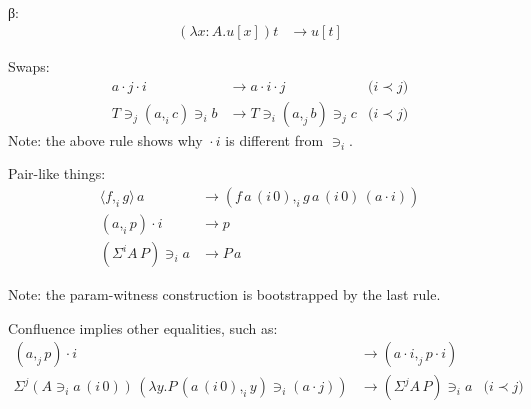 \documentclass[english]{PaperTools/latex/lipics}
\newcommand\CP[3]{(#2,_{#1} #3)}
\newcommand\param[1]{\!\cdot\!#1}
\newcommand\op[1]{∋_{#1}}
\newcommand\ip[3]{Σ^{#1} {#2}\,{#3}}
\newcommand\fp[3]{⟨#2 ,_{#1} #3⟩}
\newcommand\mor[2]{{#1}\,{#2}}
\newcommand\proj[2]{\mor{#2}{(#1\,0)}}
\newcommand\comment[1]{}
\begin{document}
\comment{
\begin{definition}[Normal forms and neutral terms]~
  \begin{align*}
    \mathsf{Nf} ∋ u,v,A,B & \coloneqq
      U \mid λx:A. t \mid (x:A) → B \\
      & \mid \CP i u v \mid \fp i u v \\
      & \mid {(\ip {i₀} A B)} \op {i₁} {u_1 \cdots} \op {i_n} {u_n} &\quad \text{($i₀ \prec i₁ \prec \ldots \prec i_n$)} \\
      & \mid s \param {i₀} \cdots \param {i_{n-1}}                  &\quad \text{($i₀ \prec   < \ldots \prec i_{n-1}$)}
    \\
    \mathsf{Ne} ∋ s & \coloneqq x \mid s \, u
  \end{align*}
\end{definition}
}
\begin{definition}~

β:
\begin{align*}
  (λx:A. u[x]) t &→ u[t]
\end{align*}

Swaps:
\begin{align*}
  a \param j \param i &→ a \param i \param j             &\text{($i \prec j$)} \\
  T \op j \CP i a c \op i b &→ T \op i \CP j a b \op j c &\text{($i \prec j$)}
\end{align*}
Note: the above rule shows why ${} \param i {}$ is different from $\op i {}$.

Pair-like things:
\begin{align*}
  {\fp i f g} \, a      &→ (f\,{\proj i a} ,_i g\,{\proj i a}\,{(a \param i)}) \\
  {(a,_i p)} \param i   &→ p \\
  {(\ip i A P)} \op i a &→ P\,a
\end{align*}

Note: the param-witness construction is bootstrapped by the last rule.

\end{definition}

Confluence implies other equalities, such as:
\begin{align*}
  {(a,_j p)} \param i &→ (a \param i ,_j p \param i)\\
  \ip j {(A \op i {\proj i a})} {(λy. P \, \CP i {\proj i a} y \op i {(a \param j)})} &→ {(\ip j A P)} \op i a &\text{($i \prec j$)}
\end{align*}
\end{document}
